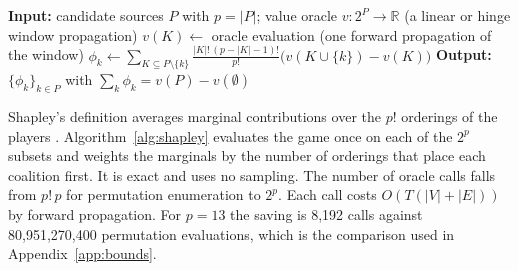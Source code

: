 \documentclass[referee,pdflatex,sn-mathphys-ay]{sn-jnl}
\theoremstyle{thmstyleone}%
\theoremstyle{thmstyletwo}%
\theoremstyle{thmstylethree}%
\begin{document}
\begin{algorithm}[tbp]
\caption{Exact subset Shapley attribution}
\label{alg:shapley}
\begin{algorithmic}[1]
\State \textbf{Input:} candidate sources $P$ with $p=|P|$; value oracle $v:2^P\to\mathbb{R}$ (a linear or hinge window propagation)
  \State $v(K)\gets$ oracle evaluation (one forward propagation of the window)
\EndFor
{}
  \State $\phi_k \gets \sum_{K\subseteq P\setminus\{k\}}\frac{|K|!\,(p-|K|-1)!}{p!}\big(v(K\cup\{k\})-v(K)\big)$
\EndFor
\State \textbf{Output:} $\{\phi_k\}_{k\in P}$ with $\sum_k\phi_k=v(P)-v(\emptyset)$
\end{algorithmic}
\end{algorithm}

Shapley's definition averages marginal contributions over the $p!$ orderings of the players \citep{shapley1953value}. Algorithm~\ref{alg:shapley} evaluates the game once on each of the $2^p$ subsets and weights the marginals by the number of orderings that place each coalition first. It is exact and uses no sampling. The number of oracle
calls falls from $p!\,p$ for permutation enumeration to $2^p$. Each call costs
$O(T(|V|+|E|))$ by forward propagation. For $p=13$ the saving is 8{,}192 calls against 80{,}951{,}270{,}400 permutation
evaluations, which is the comparison used in Appendix~\ref{app:bounds}.
\end{document}

